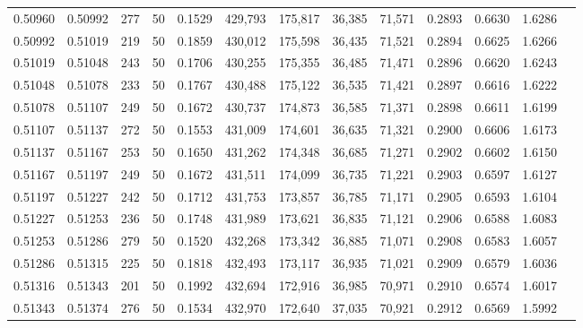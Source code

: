 \begin{tabular}{rrrrrrrrrrrrr}
0.50960 & 0.50992 &   277 &  50 &                                     0.1529 & 429,793 & 175,817 &  36,385 &  71,571 & 0.2893 & 0.6630 & 1.6286 \\
0.50992 & 0.51019 &   219 &  50 &                                     0.1859 & 430,012 & 175,598 &  36,435 &  71,521 & 0.2894 & 0.6625 & 1.6266 \\
0.51019 & 0.51048 &   243 &  50 &                                     0.1706 & 430,255 & 175,355 &  36,485 &  71,471 & 0.2896 & 0.6620 & 1.6243 \\
0.51048 & 0.51078 &   233 &  50 &                                     0.1767 & 430,488 & 175,122 &  36,535 &  71,421 & 0.2897 & 0.6616 & 1.6222 \\
0.51078 & 0.51107 &   249 &  50 &                                     0.1672 & 430,737 & 174,873 &  36,585 &  71,371 & 0.2898 & 0.6611 & 1.6199 \\
0.51107 & 0.51137 &   272 &  50 &                                     0.1553 & 431,009 & 174,601 &  36,635 &  71,321 & 0.2900 & 0.6606 & 1.6173 \\
0.51137 & 0.51167 &   253 &  50 &                                     0.1650 & 431,262 & 174,348 &  36,685 &  71,271 & 0.2902 & 0.6602 & 1.6150 \\
0.51167 & 0.51197 &   249 &  50 &                                     0.1672 & 431,511 & 174,099 &  36,735 &  71,221 & 0.2903 & 0.6597 & 1.6127 \\
0.51197 & 0.51227 &   242 &  50 &                                     0.1712 & 431,753 & 173,857 &  36,785 &  71,171 & 0.2905 & 0.6593 & 1.6104 \\
0.51227 & 0.51253 &   236 &  50 &                                     0.1748 & 431,989 & 173,621 &  36,835 &  71,121 & 0.2906 & 0.6588 & 1.6083 \\
0.51253 & 0.51286 &   279 &  50 &                                     0.1520 & 432,268 & 173,342 &  36,885 &  71,071 & 0.2908 & 0.6583 & 1.6057 \\
0.51286 & 0.51315 &   225 &  50 &                                     0.1818 & 432,493 & 173,117 &  36,935 &  71,021 & 0.2909 & 0.6579 & 1.6036 \\
0.51316 & 0.51343 &   201 &  50 &                                     0.1992 & 432,694 & 172,916 &  36,985 &  70,971 & 0.2910 & 0.6574 & 1.6017 \\
0.51343 & 0.51374 &   276 &  50 &                                     0.1534 & 432,970 & 172,640 &  37,035 &  70,921 & 0.2912 & 0.6569 & 1.5992 \\

\end{tabular}
